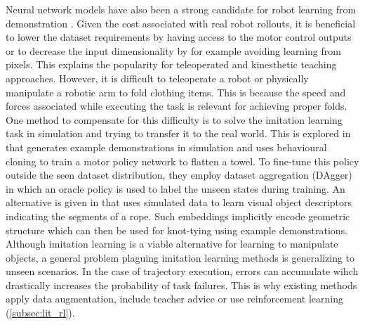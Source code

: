 \documentclass[\home/main.tex]{subfiles}
\begin{document}
Neural network models have also been a strong candidate for robot learning from demonstration \autocite{Ravichandar2020}. Given the cost associated with real robot rollouts, it is beneficial to lower the dataset requirements by having access to the motor control outputs or to decrease the input dimensionality by for example avoiding learning from pixels. This explains the popularity for teleoperated \autocite{Zhang2018,Duan2017} and kinesthetic teaching \autocite{finn2017one} approaches. However, it is difficult to teleoperate a robot or physically manipulate a robotic arm to fold clothing items. This is because the speed and forces associated while executing the task is relevant for achieving proper folds. One method to compensate for this difficulty is to solve the imitation learning task in simulation and trying to transfer it to the real world. This is explored in \autocite{Seita2020} that generates example demonstrations in simulation and uses behavioural cloning to train a motor policy network to flatten a towel. To fine-tune this policy outside the seen dataset distribution, they employ dataset aggregation (DAgger) in which an oracle policy is used to label the unseen states during training. An alternative is given in \autocite{Sundaresan2020} that uses simulated data to learn visual object descriptors indicating the segments of a rope. Such embeddings implicitly encode geometric structure which can then be used for knot-tying using example demonstrations.
Although imitation learning is a viable alternative for learning to manipulate objects, a general problem plaguing imitation learning methods is generalizing to unseen scenarios. In the case of trajectory execution, errors can accumulate wihch drastically increases the probability of task failures. This is why existing methods apply data augmentation, include teacher advice or use reinforcement learning (\cref{subsec:lit_rl}).
\end{document}
